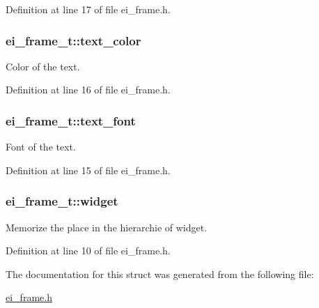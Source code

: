 Definition at line 17 of file ei\+\_\+frame.\+h.

\hypertarget{structei__frame__t_adf806a6e4efd6a6fb28a286344c3448c}{
\subsubsection[{text\+\_\+color}]{ ei\+\_\+frame\+\_\+t\+::text\+\_\+color}}\label{structei__frame__t_adf806a6e4efd6a6fb28a286344c3448c}


Color of the text. 



Definition at line 16 of file ei\+\_\+frame.\+h.

\hypertarget{structei__frame__t_a9ecc6a5030ccee171098b953014b1798}{
\subsubsection[{text\+\_\+font}]{ ei\+\_\+frame\+\_\+t\+::text\+\_\+font}}\label{structei__frame__t_a9ecc6a5030ccee171098b953014b1798}


Font of the text. 



Definition at line 15 of file ei\+\_\+frame.\+h.

\hypertarget{structei__frame__t_a712db0711a6f2da5e96df73f562572b6}{
\subsubsection[{widget}]{ ei\+\_\+frame\+\_\+t\+::widget}}\label{structei__frame__t_a712db0711a6f2da5e96df73f562572b6}


Memorize the place in the hierarchie of widget. 



Definition at line 10 of file ei\+\_\+frame.\+h.



The documentation for this struct was generated from the following file\+:\begin{DoxyCompactItemize}
\item 
\hyperlink{ei__frame_8h}{ei\+\_\+frame.\+h}\end{DoxyCompactItemize}
